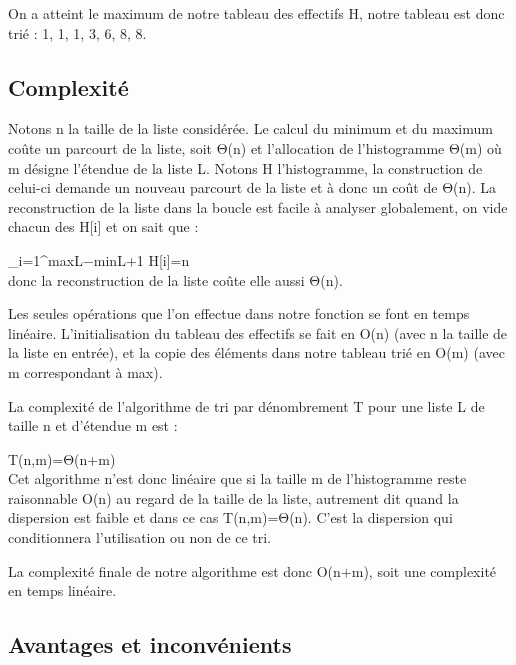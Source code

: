 \documentclass[12pt]{article}
\begin{document}
\vspace{1.0 cm}
On a atteint le maximum de notre tableau des effectifs H, notre tableau est donc trié : 1, 1, 1, 3, 6, 8, 8.




\newpage 
\subsection{Complexité}



Notons n la taille de la liste considérée. Le calcul du minimum et du maximum coûte un parcourt de la liste, soit Θ(n) et l'allocation de l'histogramme Θ(m) où m désigne l'étendue de la liste L. Notons H l'histogramme, la construction de celui-ci demande un nouveau parcourt de la liste et à donc un coût de Θ(n). La reconstruction de la liste dans la boucle est facile à analyser globalement, on vide chacun des H[i] et on sait que : 


\hspace{6.0 cm}\large\sum\limits_{i=1}^{maxL−minL+1}  H[i]=n \\


\normalsize donc la reconstruction de la liste coûte elle aussi Θ(n).


\normalsize Les seules opérations que l'on effectue dans notre fonction se font en temps linéaire. L'initialisation du tableau des effectifs se fait en O(n) (avec n la taille de la liste en entrée), et la copie des éléments dans notre tableau trié en O(m) (avec m correspondant à max).


La complexité de l'algorithme de tri par dénombrement T pour une liste L de taille n et d'étendue m est : 


\hspace{6.0 cm}\large T(n,m)=Θ(n+m) \\ 


\normalsize Cet algorithme n'est donc linéaire que si la taille m de l'histogramme reste raisonnable O(n) au regard de la taille de la liste, autrement dit quand la dispersion est faible et dans ce cas T(n,m)=Θ(n). C'est la dispersion qui conditionnera l'utilisation ou non de ce tri. 




La complexité finale de notre algorithme est donc O(n+m), soit une complexité en temps linéaire.

\newpage
\subsection{Avantages et inconvénients}
\end{document}
